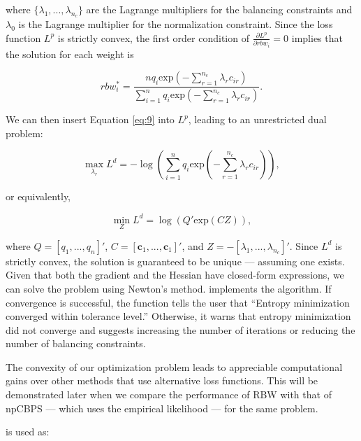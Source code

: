 where \(\{\lambda_{1},...,\lambda_{n_{c}}\}\) are the Lagrange
multipliers for the balancing constraints and \(\lambda_{0}\) is the
Lagrange multiplier for the normalization constraint. Since the loss
function \(L^{p}\) is strictly convex, the first order condition of
\(\frac{\partial L^{p}}{\partial rbw_{i}}=0\) implies that the solution
for each weight is

\begin{equation}
\label{eq:9}
rbw_{i}^{*}=\frac{nq_{i}\text{exp}(-\sum^{n_{c}}_{r=1}\lambda_{r}c_{ir})}{\sum^{n}_{i=1}q_{i}\text{exp}(-\sum^{n_{c}}_{r=1}\lambda_{r}c_{ir})}. 
\end{equation}

We can then insert Equation \ref{eq:9} into \(L^{p}\), leading to an
unrestricted dual problem:

\begin{equation}
\label{eq:10}
\max_{\lambda_{r}}L^{d}=-\log \left(\sum^{n}_{i=1}q_{i}\text{exp}\left(-\sum^{n_{c}}_{r=1}\lambda_{r}c_{ir}\right)\right),
\end{equation}

or equivalently,

\begin{equation}
\label{eq:11}
\min_{Z}L^{d}=\log \left(Q'\text{exp}(CZ)\right),
\end{equation}

where \(Q=[q_{1},...,q_{n}]'\),
\(C=[\boldsymbol{c}_{1},...,\boldsymbol{c}_{1}]'\), and
\(Z=-[\lambda_{1},...,\lambda_{n_{c}}]'\). Since \(L^{d}\) is strictly
convex, the solution is guaranteed to be unique --- assuming one exists.
Given that both the gradient and the Hessian have closed-form
expressions, we can solve the problem using Newton's method.
 implements the algorithm. If convergence is successful, the
function tells the user that ``Entropy minimization converged within
tolerance level.'' Otherwise, it warns that entropy minimization did not
converge and suggests increasing the number of iterations or reducing
the number of balancing constraints.

The convexity of our optimization problem leads to appreciable
computational gains over other methods that use alternative loss
functions. This will be demonstrated later when we compare the
performance of RBW with that of npCBPS --- which uses the empirical
likelihood --- for the same problem.

 is used as:



